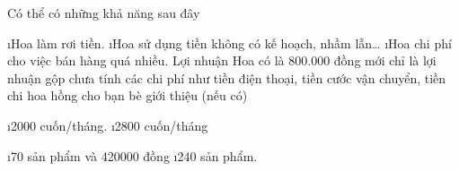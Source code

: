 \begin{Answer}{5}
		Có thể có những khả năng sau đây
		\begin{enumerate}[--,leftmargin=*]
			\i Hoa làm rơi tiền.
			\i Hoa sử dụng tiền không có kế hoạch, nhầm lẫn…
			\i Hoa chi phí cho việc bán hàng quá nhiều. Lợi nhuận Hoa có là 800.000 đồng mới chỉ là lợi nhuận gộp chưa tính các chi phí như tiền điện thoại, tiền cước vận chuyển, tiền chi hoa hồng cho bạn bè giới thiệu (nếu có)
		\end{enumerate}
	
\end{Answer}
\begin{Answer}{6}
		\begin{enumerate}[a),leftmargin=*]
			\i 2000 cuốn/tháng.
			\i 2800 cuốn/tháng
		\end{enumerate}
	
\end{Answer}
\begin{Answer}{7}
		\begin{enumerate}[a),leftmargin=*]
			\i 70 sản phẩm và 420000 đồng
			\i 240 sản phẩm.
		\end{enumerate}
	
\end{Answer}
